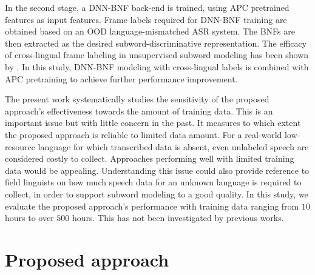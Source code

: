\documentclass[a4paper]{article}
\begin{document}
In  the second stage, a DNN-BNF back-end is trained, using APC pretrained features as input features. 
Frame labels required for DNN-BNF training are obtained based on an OOD language-mismatched ASR system.  
The BNFs are then extracted as the desired subword-discriminative representation. 
The efficacy of cross-lingual frame labeling in unsupervised subword modeling  has been shown by \cite{feng2018exploiting,feng2019_TASLP}. In this study, 
 DNN-BNF modeling with cross-lingual labels is
combined  with APC pretraining to achieve further performance improvement.

The present work systematically studies the  sensitivity of the proposed approach's effectiveness towards  the amount of training data.
This is an important issue but with little concern in the past. 
It measures to which extent the proposed approach is reliable to limited data amount. For a real-world low-resource language for which transcribed data is absent, 
even unlabeled speech are considered costly to collect. Approaches performing well with limited training data  would be appealing. 
Understanding this issue  could also provide reference to field linguists on how much speech data for an unknown language  is required to collect, in order to support subword modeling to a good quality. 
In this study, we evaluate the proposed approach's performance with    training data ranging from $10$ hours to over $500$ hours. This has not been investigated by previous works.


\section{Proposed approach}
\end{document}
